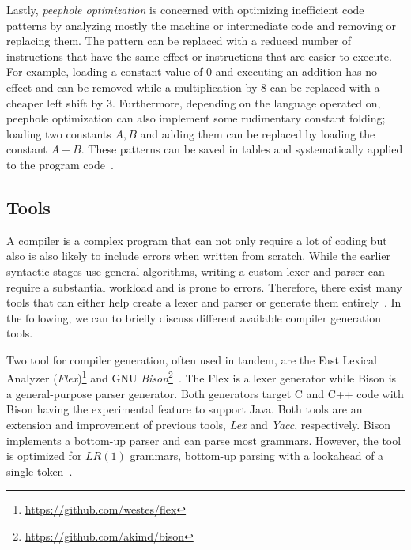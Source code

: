 Lastly, \emph{peephole optimization} is concerned with optimizing inefficient code patterns by analyzing mostly the machine or intermediate code and removing or replacing them. The pattern can be replaced with a reduced number of instructions that have the same effect or instructions that are easier to execute. For example, loading a constant value of $0$ and executing an addition has no effect and can be removed while a multiplication by $8$ can be replaced with a cheaper left shift by $3$. Furthermore, depending on the language operated on, peephole optimization can also implement some rudimentary constant folding; loading two constants $A, B$ and adding them can be replaced by loading the constant $A + B$. These patterns can be saved in tables and systematically applied to the program code~\cite{McKe65,TvS82}.

\subsection{Tools}
\label{sec:background_compilerTools}
A compiler is a complex program that can not only require a lot of coding but also is also likely to include errors when written from scratch. While the earlier syntactic stages use general algorithms, writing a custom lexer and parser can require a substantial workload and is prone to errors. Therefore, there exist many tools that can either help create a lexer and parser or generate them entirely~\cite{PaFi11, ZLY17}. In the following, we can to briefly discuss different available compiler generation tools.

Two tool for compiler generation, often used in tandem, are the Fast Lexical Analyzer (\emph{Flex})\footnote{\url{https://github.com/westes/flex}} and GNU \emph{Bison}\footnote{\url{https://github.com/akimd/bison}}~\cite{DoSt99}. 
The Flex is a lexer generator while Bison is a general-purpose parser generator. Both generators target C and C++ code with Bison having the experimental feature to support Java. 
Both tools are an extension and improvement of previous tools, \emph{Lex} and \emph{Yacc}, respectively. 
Bison implements a bottom-up parser and can parse most grammars. However, the tool is optimized for $LR(1)$ grammars, \ie bottom-up parsing with a lookahead of a single token~\cite{ZLY17,Aaby03,DoSt99}. 

